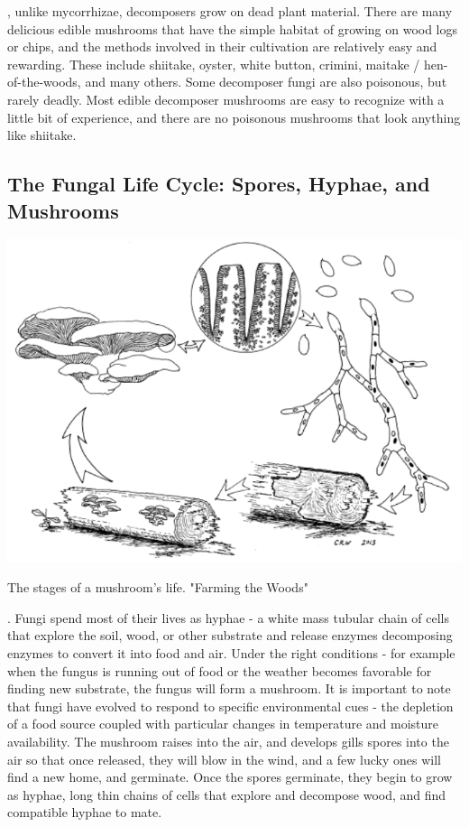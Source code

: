 \documentclass{tufte-handout}
\begin{document}
, unlike mycorrhizae, decomposers grow on dead plant material.  
There are many delicious edible mushrooms that have the simple habitat of growing on wood logs or chips, and the methods involved in their cultivation are relatively easy and rewarding. 
These include shiitake, oyster, white button, crimini, maitake / hen-of-the-woods, and many others.
Some decomposer fungi are also poisonous, but rarely deadly. 
Most edible decomposer mushrooms are easy to recognize with a little bit of experience, and there are no poisonous mushrooms that look anything like shiitake.

\subsection{The Fungal Life Cycle: Spores, Hyphae, and Mushrooms}

\begin{marginfigure}
\includegraphics{crw-mushroom-lifecycle}
\caption{The stages of a mushroom's life. "Farming the Woods"}
\end{marginfigure}

. 
Fungi spend most of their lives as hyphae - a white mass tubular chain of cells that explore the soil, wood, or other substrate and release enzymes decomposing enzymes to convert it into food and air. 
Under the right conditions - for example when the fungus is running out of food or the weather becomes favorable for finding new substrate, the fungus will form a mushroom.
It is important to note that fungi have evolved to respond to specific environmental cues - the depletion of a food source coupled with particular changes in temperature and moisture availability. 
The mushroom raises into the air, and develops gills spores into the air so that once released, they will blow in the wind, and a few lucky ones will find a new home, and germinate.
Once the spores germinate, they begin to grow as hyphae, long thin chains of cells that explore and decompose wood, and find compatible hyphae to mate.
\end{document}
